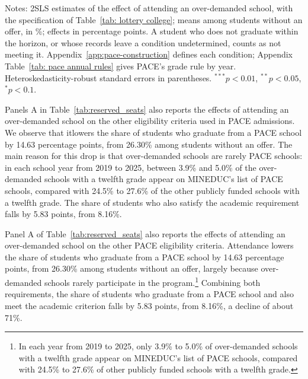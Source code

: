\begin{table}[htp!]
\singlespacing\renewcommand{\arraystretch}{1.2}
\centering
\caption{{PACE and BEA: Attendance Effects on Their Conditions}}\label{tab:reserved_seats}
\small

\par\smallskip
\begin{minipage}{\textwidth}\footnotesize
{Notes: 2SLS estimates of the effect of attending an over-demanded school, with the specification of Table~\ref{tab: lottery college}; means among students without an offer, in \%; effects in percentage points. A student who does not graduate within the horizon, or whose records leave a condition undetermined, counts as not meeting it. Appendix~\ref{app:pace-construction} defines each condition; Appendix Table~\ref{tab: pace annual rules} gives PACE's grade rule by year. Heteroskedasticity-robust standard errors in parentheses. $^{***}p<0.01$, $^{**}p<0.05$, $^{*}p<0.1$.}
\end{minipage}
\end{table}

Panels A in Table~\ref{tab:reserved_seats} also reports the effects of attending an over-demanded school on the other eligibility criteria used in PACE admissions. We observe that itlowers the share of students who graduate from a PACE school by 14.63 percentage points, from 26.30\% among students without an offer. The main reason for this drop is that over-demanded schools are rarely PACE schools: in each school year from 2019 to 2025, between 3.9\% and 5.0\% of the over-demanded schools with a twelfth grade appear on MINEDUC's list of PACE schools, compared with 24.5\% to 27.6\% of the other publicly funded schools with a twelfth grade. The share of students who also satisfy the academic requirement falls by 5.83 points, from 8.16\%.

Panel A of Table~\ref{tab:reserved_seats} also reports the effects of attending an over-demanded school on the other PACE eligibility criteria. Attendance lowers the share of students who graduate from a PACE school by 14.63 percentage points, from 26.30\% among students without an offer, largely because over-demanded schools rarely participate in the program.\footnote{In each year from 2019 to 2025, only 3.9\% to 5.0\% of over-demanded schools with a twelfth grade appear on MINEDUC's list of PACE schools, compared with 24.5\% to 27.6\% of other publicly funded schools with a twelfth grade.} Combining both requirements, the share of students who graduate from a PACE school and also meet the academic criterion falls by 5.83 points, from 8.16\%, a decline of about 71\%.


